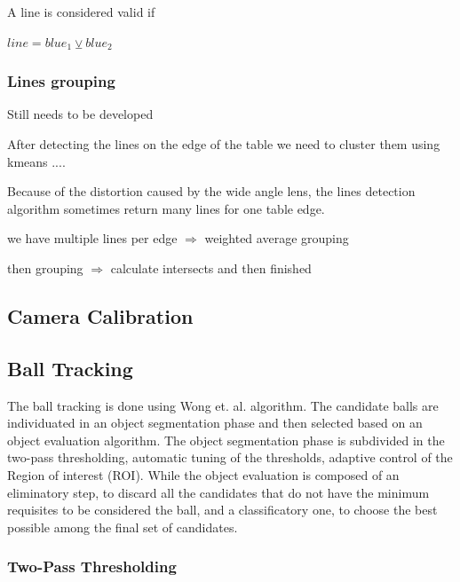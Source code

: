 \documentclass[a4paper]{article}
\begin{document}
A line is considered valid if

$line = blue_{1} \veebar blue_{2}$  

\subsubsection{Lines grouping}

Still needs to be developed 

After detecting the lines on the edge of the table we need to cluster them using kmeans ....

Because of the distortion caused by the wide angle lens, the lines detection algorithm sometimes return many lines for one table edge.

we have multiple lines per edge $\Rightarrow$  weighted average grouping

then grouping $\Rightarrow$ calculate intersects and then finished

\subsection{Camera Calibration}
\subsection{Ball Tracking}

The ball tracking is done using Wong et. al.\cite{Wong} algorithm. The candidate balls are individuated in an object segmentation phase and then selected based on an object evaluation algorithm. The object segmentation phase is subdivided in the two-pass thresholding, automatic tuning of the thresholds, adaptive control of the Region of interest (ROI). While the object evaluation is composed of an eliminatory step, to discard all the candidates that do not have the minimum requisites to be considered the ball, and a classificatory one, to choose the best possible among the final set of candidates.

\subsubsection{Two-Pass Thresholding}
\end{document}
